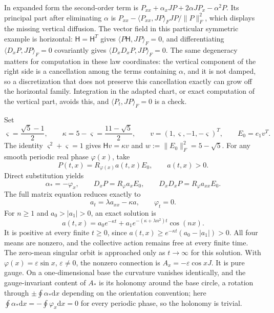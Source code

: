 In expanded form the second-order term is
$P_{xx}+\alpha_xJP+2\alpha JP_x-\alpha^2P$.
Its principal part after eliminating $\alpha$ is
$P_{xx}-\langle P_{xx},JP\rangle_FJP/\|P\|_F^2$,
which displays the missing vertical diffusion. The vector field in this particular symmetric example is horizontal: $\mathsf H=\mathsf H^T$ gives $\langle P\mathsf H,JP\rangle_F=0$, and differentiating $\langle D_xP,JP\rangle_F=0$ covariantly gives $\langle D_xD_xP,JP\rangle_F=0$. The same degeneracy matters for computation in these law coordinates: the vertical component of the right side is a cancellation among the terms containing $\alpha$, and it is not damped, so a discretization that does not preserve this cancellation exactly can grow off the horizontal family. Integration in the adapted chart, or exact computation of the vertical part, avoids this, and $\langle P_t,JP\rangle_F=0$ is a check.

Set
\begin{equation}
 \varsigma=\frac{\sqrt5-1}{2},\qquad
 \kappa=5-\varsigma=\frac{11-\sqrt5}{2},\qquad
 v=(1,\varsigma,-1,-\varsigma)^T,\qquad E_0=e_1v^T.
\end{equation}
The identity $\varsigma^2+\varsigma=1$ gives $\mathsf Hv=\kappa v$ and
$w:=\|E_0\|_F^2=5-\sqrt5$.
For any smooth periodic real phase $\varphi(x)$, take
\begin{equation}
 P(t,x)=R_{\varphi(x)}a(t,x)E_0,\qquad a(t,x)>0.
\end{equation}
Direct substitution yields
\begin{equation}
 \alpha_*=-\varphi_x,\qquad
 D_xP=R_\varphi a_xE_0,\qquad
 D_xD_xP=R_\varphi a_{xx}E_0.
\end{equation}
The full matrix equation reduces exactly to
\begin{equation}
 a_t=\lambda a_{xx}-\kappa a,\qquad \varphi_t=0.
\end{equation}
For $n\geq1$ and $a_0>|a_1|>0$, an exact solution is
\begin{equation}
 \boxed{a(t,x)=a_0e^{-\kappa t}
                 +a_1e^{-(\kappa+\lambda n^2)t}\cos(nx).}
 \label{ctx:c:eq:exact}
\end{equation}
It is positive at every finite $t\geq0$, since
$a(t,x)\geq e^{-\kappa t}(a_0-|a_1|)>0$.
All four means are nonzero, and the collective action remains free at every finite time. The zero-mean singular orbit is approached only as $t\to\infty$ for this solution. With $\varphi(x)=\varepsilon\sin x$, $\varepsilon\ne0$, the nonzero connection is $A_x=-\varepsilon\cos x J$. It is pure gauge. On a one-dimensional base the curvature vanishes identically, and the gauge-invariant content of $A_*$ is its holonomy around the base circle, a rotation through $\pm\oint\alpha_*\mathrm dx$ depending on the orientation convention; here $\oint\alpha_*\mathrm dx=-\oint\varphi_x\mathrm dx=0$ for every periodic phase, so the holonomy is trivial.

